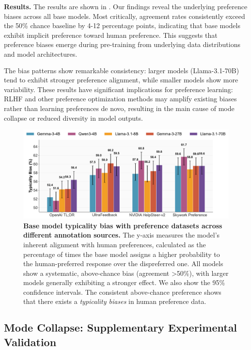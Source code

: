   \textbf{Results.} The results are shown in . Our findings reveal the underlying preference biases across all base
  models. Most critically, agreement rates consistently exceed the 50\% chance
  baseline by 4-12 percentage points, indicating that base models exhibit implicit preference toward human preference. This suggests that preference biases emerge
  during pre-training from underlying data distributions and model architectures.

  The bias patterns show remarkable consistency: larger models (Llama-3.1-70B) tend to exhibit
  stronger preference alignment, while smaller models show more variability. These results have significant implications for preference learning: RLHF and other preference
  optimization methods may amplify existing biases rather than learning preferences de novo,
resulting in the main cause of mode collapse or reduced diversity in model outputs.

  \begin{figure}[!htbp]
      \centering
      \includegraphics[width=\linewidth]{figures/appendix/cognitive_bias_combined.pdf}
      \caption{\textbf{Base model typicality bias with preference datasets across different annotation sources.} 
      The y-axis measures the model's inherent alignment with human preferences, calculated as the percentage of times the base model assigns a higher probability to the human-preferred response over the dispreferred one. 
      All models show a systematic, above-chance bias (agreement >50\%), with larger models generally exhibiting a stronger effect.
      We also show the 95\% confidence intervals. 
      The consistent above-chance preference shows that there exists a \textit{typicality biases} in human preference data.
  }
      \label{fig:cognitive_bias_panels}
  \end{figure}
  
\subsection{Mode Collapse: Supplementary Experimental Validation}
\label{app:evidence-controls}

